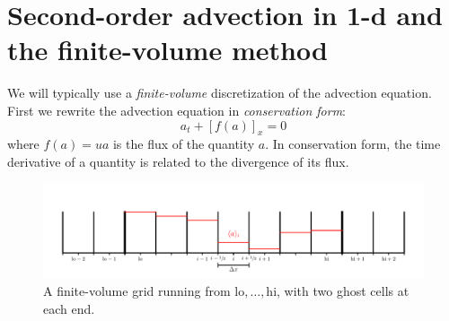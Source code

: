 \section{Second-order advection in 1-d and the finite-volume method}

We will typically use a {\em finite-volume} discretization of the
advection equation.  First we rewrite the advection equation in {\em
  conservation form}:
\begin{equation}
a_t + \left[f(a)\right]_x = 0
\label{eq:advect-cons}
\end{equation}
where $f(a) = ua$ is the flux of the quantity $a$.  In conservation form,
the time derivative of a quantity is related to the divergence of 
its flux.

\begin{figure}
\centering
\includegraphics[width=\linewidth]{fv_ghost}
\caption[A finite-volume grid with valid cells
  labelled]{\label{fig:fvghost} A finite-volume grid running from
  $\mathrm{lo}, \ldots, \mathrm{hi}$, with two ghost cells at each
  end.}
\end{figure}

